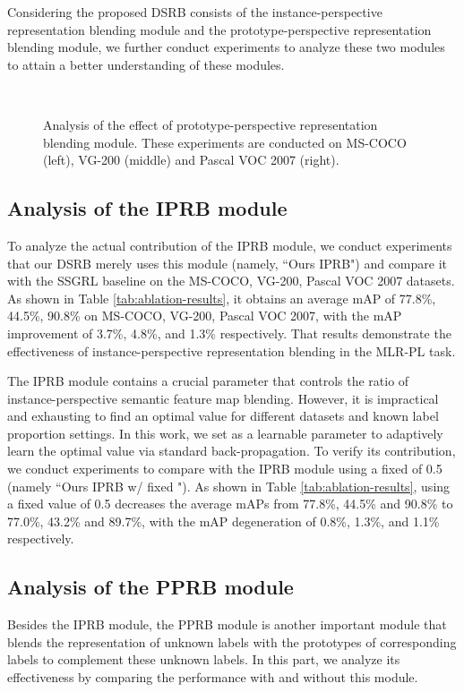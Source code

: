 \documentclass[lettersize,journal]{IEEEtran}
\begin{document}
Considering the proposed DSRB consists of the instance-perspective representation blending module and the prototype-perspective representation blending module, we further conduct experiments to analyze these two modules to attain a better understanding of these modules.

\begin{figure*}[!t] 
  \centering    
{}~     
~
~
  \caption{Analysis of the effect of prototype-perspective representation blending module. These experiments are conducted on MS-COCO (left), VG-200 (middle) and Pascal VOC 2007 (right).}     
  \label{fig:loss-result}     
\end{figure*}

\subsection{Analysis of the IPRB module}
To analyze the actual contribution of the IPRB module, we conduct experiments that our DSRB merely uses this module (namely, ``Ours IPRB") and compare it with the SSGRL baseline on the MS-COCO, VG-200, Pascal VOC 2007 datasets. As shown in Table \ref{tab:ablation-results}, it obtains an average mAP of 77.8\%, 44.5\%, 90.8\% on MS-COCO, VG-200, Pascal VOC 2007, with the mAP improvement of 3.7\%, 4.8\%, and 1.3\% respectively. That results demonstrate the effectiveness of instance-perspective representation blending in the MLR-PL task.

The IPRB module contains a crucial parameter  that controls the ratio of instance-perspective semantic feature map blending. However, it is impractical and exhausting to find an optimal value for different datasets and known label proportion settings. In this work, we set  as a learnable parameter to adaptively learn the optimal value via standard back-propagation. To verify its contribution, we conduct experiments to compare with the IPRB module using a fixed  of 0.5 (namely ``Ours IPRB w/ fixed "). As shown in Table \ref{tab:ablation-results}, using a fixed value of 0.5 decreases the average mAPs from 77.8\%, 44.5\% and 90.8\% to 77.0\%, 43.2\% and 89.7\%, with the mAP degeneration of 0.8\%, 1.3\%, and 1.1\% respectively. 

\subsection{Analysis of the PPRB module}
Besides the IPRB module, the PPRB module is another important module that blends the representation of unknown labels with the prototypes of corresponding labels to complement these unknown labels. In this part, we analyze its effectiveness by comparing the performance with and without this module. 
\end{document}
